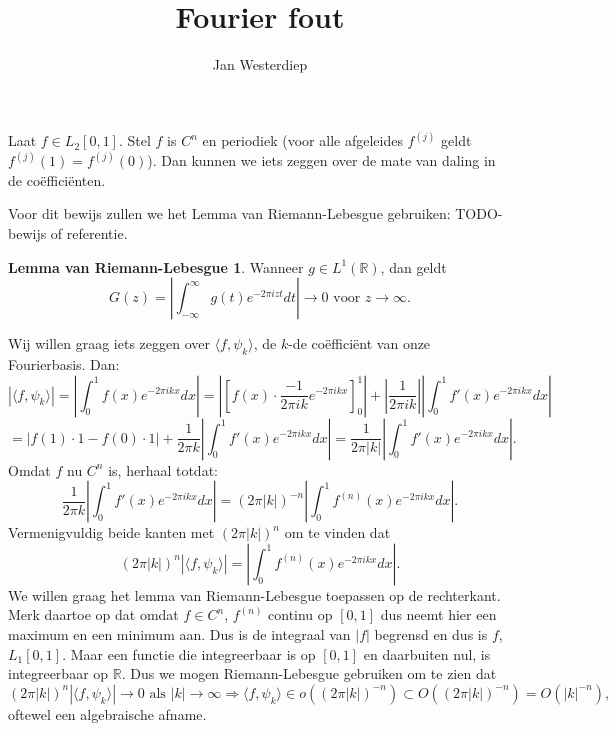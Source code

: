 \documentclass[11pt]{amsart}
\theoremstyle{definition}
\newcommand{\R}{\mathbb{R}}
\newtheorem*{thm}{Lemma van Riemann-Lebesgue}
\begin{document}
\title{Fourier fout}
\author{Jan Westerdiep}
\maketitle

Laat $f \in L_2[0,1]$. Stel $f$ is $C^n$ en periodiek (voor alle afgeleides $f^{(j)}$ geldt $f^{(j)}(1) = f^{(j)}(0)$). Dan kunnen we iets zeggen over de mate van daling in de co\"effici\"enten.

Voor dit bewijs zullen we het Lemma van Riemann-Lebesgue gebruiken: TODO-bewijs of referentie.
\begin{thm}
Wanneer $g \in L^1(\R)$, dan geldt
\[
	G(z) = \left|\int_{-\infty}^\infty g(t) e^{- 2 \pi i z t} dt\right| \to 0 \text{ voor } z \to \infty.
\]
\end{thm}

Wij willen graag iets zeggen over $\langle f, \psi_k\rangle$, de $k$-de co\"effici\"ent van onze Fourierbasis. Dan:
\[
	|\langle f, \psi_k \rangle| = \left|\int_0^1 f(x) e^{- 2 \pi i k x} dx\right| = \left|\left[ f(x) \cdot \frac{-1}{2 \pi i k} e^{- 2 \pi i k x} \right]_0^1\right| + \left|\frac{1}{2 \pi i k}\right| \left|\int_0^1 f'(x) e^{-2 \pi i k x} dx \right|
\]
\[
	= | f(1) \cdot 1 - f(0) \cdot 1| + \frac{1}{2 \pi k} \left| \int_0^1 f'(x) e^{-2 \pi i k x} dx \right| = \frac{1}{2 \pi |k|} \left| \int_0^1 f'(x) e^{-2 \pi i k x} dx \right|.
\]
Omdat $f$ nu $C^n$ is, herhaal totdat:
\[
	\frac{1}{2 \pi k} \left| \int_0^1 f'(x) e^{-2 \pi i k x} dx \right| = (2 \pi |k|)^{-n}\left| \int_0^1 f^{(n)}(x) e^{- 2 \pi i k x} dx \right|.
\]
Vermenigvuldig beide kanten met $(2 \pi |k|)^n$ om te vinden dat
\[
	(2 \pi |k|)^n |\langle f, \psi_k \rangle| = \left| \int_0^1 f^{(n)}(x) e^{- 2 \pi i k x} dx \right|.
\]
We willen graag het lemma van Riemann-Lebesgue toepassen op de rechterkant. Merk daartoe op dat omdat $f \in C^n$, $f^{(n)}$ continu op $[0,1]$ dus neemt hier een maximum en een minimum aan. Dus is de integraal van $|f|$ begrensd en dus is $f$, $L_1[0,1]$. Maar een functie die integreerbaar is op $[0,1]$ en daarbuiten nul, is integreerbaar op $\R$. Dus we mogen Riemann-Lebesgue gebruiken om te zien dat
\[
	(2 \pi |k|)^n |\langle f, \psi_k \rangle| \to 0 \text{ als } |k| \to \infty \Rightarrow \langle f, \psi_k \rangle \in o((2 \pi |k|)^{-n}) \subset O((2 \pi |k|)^{-n}) = O(|k|^{-n}),
\]
oftewel een algebraische afname.
\end{document}
